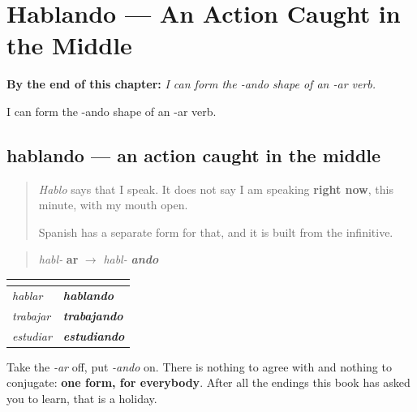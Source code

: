 
\chapter{Hablando --- An Action Caught in the Middle}
\label{ch:hablando}

\begin{chapteropening}
\textbf{By the end of this chapter:} \emph{I can form the -ando shape of an -ar verb.}

I can form the -ando shape of an -ar verb.
\end{chapteropening}

\section[hablando]{hablando — an action caught in the middle}

\label{lesson:ES-C62-hablando}



\begin{quote}
\emph{Hablo} says that I speak. It does not say I am speaking \textbf{right now}, this minute, with my mouth open.

Spanish has a separate form for that, and it is built from the infinitive.
\end{quote}

\begin{grammarlens}[title={Grammar Lens: swap the ending}]
\begin{quote}
\emph{habl-} \textbf{ar} $\to$ \emph{habl-} \emph{\textbf{ando}}
\end{quote}

\noindent
\begin{tabularx}{\linewidth}{@{}>{\raggedright\arraybackslash}X>{\raggedright\arraybackslash}X@{}}
\toprule
\textbf{} & \textbf{} \\
\midrule
\emph{hablar} & \emph{\textbf{hablando}} \\
\emph{trabajar} & \emph{\textbf{trabajando}} \\
\emph{estudiar} & \emph{\textbf{estudiando}} \\
\bottomrule
\end{tabularx}

Take the \emph{-ar} off, put \emph{-ando} on. There is nothing to agree with and nothing to conjugate: \textbf{one form, for everybody}. After all the endings this book has asked you to learn, that is a holiday.
\end{grammarlens}

